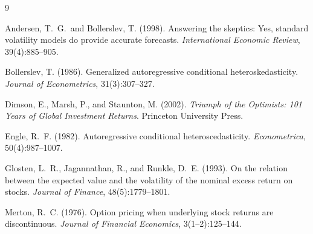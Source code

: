 \documentclass[11pt, a4paper]{article}
\begin{document}
\newpage

\begin{thebibliography}{9}

Andersen, T.~G.\ and Bollerslev, T. (1998).
Answering the skeptics: Yes, standard volatility models do provide accurate forecasts.
\emph{International Economic Review}, 39(4):885--905.

Bollerslev, T. (1986).
Generalized autoregressive conditional heteroskedasticity.
\emph{Journal of Econometrics}, 31(3):307--327.

Dimson, E., Marsh, P., and Staunton, M. (2002).
\emph{Triumph of the Optimists: 101 Years of Global Investment Returns}.
Princeton University Press.

Engle, R.~F. (1982).
Autoregressive conditional heteroscedasticity.
\emph{Econometrica}, 50(4):987--1007.

Glosten, L.~R., Jagannathan, R., and Runkle, D.~E. (1993).
On the relation between the expected value and the volatility of the nominal excess return on stocks.
\emph{Journal of Finance}, 48(5):1779--1801.

Merton, R.~C. (1976).
Option pricing when underlying stock returns are discontinuous.
\emph{Journal of Financial Economics}, 3(1--2):125--144.

\end{thebibliography}
\end{document}
